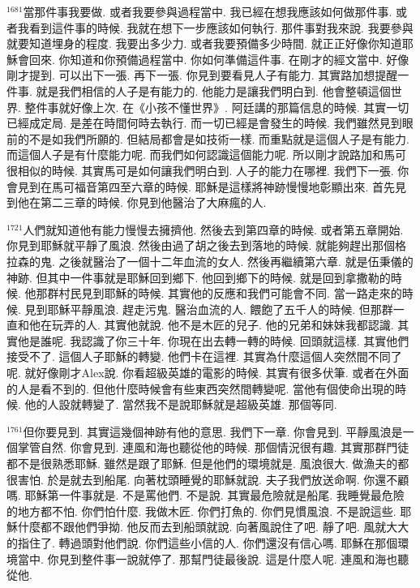 \documentclass{book}
\begin{document}
$^{1681}$當那件事我要做.
或者我要參與過程當中.
我已經在想我應該如何做那件事.
或者我看到這件事的時候.
我就在想下一步應該如何執行.
那件事對我來說.
我要參與就要知道埋身的程度.
我要出多少力.
或者我要預備多少時間.
就正正好像你知道耶穌會回來.
你知道和你預備過程當中.
你如何準備這件事.
在剛才的經文當中.
好像剛才提到.
可以出下一張.
再下一張.
你見到要看見人子有能力.
其實路加想提醒一件事.
就是我們相信的人子是有能力的.
他能力是讓我們明白到.
他會整頓這個世界.
整件事就好像上次.
在《小孩不懂世界》.
阿廷講的那篇信息的時候.
其實一切已經成定局.
是差在時間何時去執行.
而一切已經是會發生的時候.
我們雖然見到眼前的不是如我們所願的.
但結局都會是如技術一樣.
而重點就是這個人子是有能力.
而這個人子是有什麼能力呢.
而我們如何認識這個能力呢.
所以剛才說路加和馬可很相似的時候.
其實馬可是如何讓我們明白到.
人子的能力在哪裡.
我們下一張.
你會見到在馬可福音第四至六章的時候.
耶穌是這樣將神跡慢慢地彰顯出來.
首先見到他在第二三章的時候.
你見到他醫治了大麻瘋的人.

$^{1721}$人們就知道他有能力慢慢去擁擠他.
然後去到第四章的時候.
或者第五章開始.
你見到耶穌就平靜了風浪.
然後由過了胡之後去到落地的時候.
就能夠趕出那個格拉森的鬼.
之後就醫治了一個十二年血流的女人.
然後再繼續第六章.
就是伍秉儀的神跡.
但其中一件事就是耶穌回到鄉下.
他回到鄉下的時候.
就是回到拿撒勒的時候.
他那群村民見到耶穌的時候.
其實他的反應和我們可能會不同.
當一路走來的時候.
見到耶穌平靜風浪.
趕走污鬼.
醫治血流的人.
餵飽了五千人的時候.
但那群一直和他在玩弄的人.
其實他就說.
他不是木匠的兒子.
他的兄弟和妹妹我都認識.
其實他是誰呢.
我認識了你三十年.
你現在出去轉一轉的時候.
回頭就這樣.
其實他們接受不了.
這個人子耶穌的轉變.
他們卡在這裡.
其實為什麼這個人突然間不同了呢.
就好像剛才Alex說.
你看超級英雄的電影的時候.
其實有很多伏筆.
或者在外面的人是看不到的.
但他什麼時候會有些東西突然間轉變呢.
當他有個使命出現的時候.
他的人設就轉變了.
當然我不是說耶穌就是超級英雄.
那個等同.

$^{1761}$但你要見到.
其實這幾個神跡有他的意思.
我們下一章.
你會見到.
平靜風浪是一個掌管自然.
你會見到.
連風和海也聽從他的時候.
那個情況很有趣.
其實那群門徒都不是很熟悉耶穌.
雖然是跟了耶穌.
但是他們的環境就是.
風浪很大.
做漁夫的都很害怕.
於是就去到船尾.
向著枕頭睡覺的耶穌就說.
夫子我們放送命啊.
你還不顧嗎.
耶穌第一件事就是.
不是罵他們.
不是說.
其實最危險就是船尾.
我睡覺最危險的地方都不怕.
你們怕什麼.
我做木匠.
你們打魚的.
你們見慣風浪.
不是說這些.
耶穌什麼都不跟他們爭拗.
他反而去到船頭就說.
向著風說住了吧.
靜了吧.
風就大大的指住了.
轉過頭對他們說.
你們這些小信的人.
你們還沒有信心嗎.
耶穌在那個環境當中.
你見到整件事一說就停了.
那幫門徒最後說.
這是什麼人呢.
連風和海也聽從他.
\end{document}
